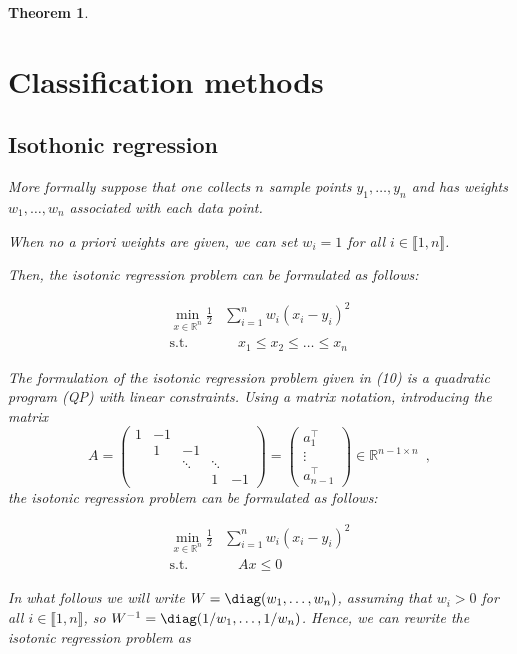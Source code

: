 \documentclass[12pt,preprint]{elsarticle}
\newtheorem{Theorem}{Theorem}
\begin{document}
\begin{Theorem}
\section{Classification methods}
\subsection{Isothonic regression}


More formally suppose that one collects $n$ sample points $y_1,\dots, y_n$ and has weights $w_1, \dots, w_n$ associated with each data point.

When no a priori weights are given, we can set $w_i = 1$ for all $i \in \llbracket 1, n \rrbracket$.

Then, the isotonic regression problem can be formulated as follows:

\begin{align}
\min_{x \in \mathbb{R}^n}
\frac{1}{2}
& \sum_{i=1}^{n} w_i (x_i - y_i)^2 \\
\text{s.t.} & \quad x_1 \leq x_2 \leq \ldots \leq x_n \nonumber
\end{align}

The formulation of the isotonic regression problem given in (10) is a quadratic program (QP) with linear constraints.
Using a matrix notation, introducing the matrix
$$A = \begin{pmatrix} 1 & -1 &                       &                       &    \\
  & 1  & -1                    &                       &    \\
  &    & \ddots & \ddots &    \\
  &    &                       & 1                     & -1\end{pmatrix}
 =
\begin{pmatrix}
a_1^\top \\
\vdots   \\
a_{n-1}^\top
\end{pmatrix}
 \in \mathbb{R}^{n-1 \times n}\enspace,
$$
the isotonic regression problem can be formulated as follows:

\begin{align}
\min_{x \in \mathbb{R}^n}
\frac{1}{2}
& \sum_{i=1}^{n} w_i (x_i - y_i)^2 \\
\text{s.t.} & \quad Ax \leq 0 \nonumber
\end{align}




In what follows we will write $W=\diag(w_1,\dots,w_n)$, assuming that $w_i > 0$ for all $i \in \llbracket 1, n \rrbracket$, so $W^{-1}= \diag(1/w_1,\dots,1/w_n)$.
Hence, we can rewrite the isotonic regression problem as



\end{Theorem}
\end{document}
